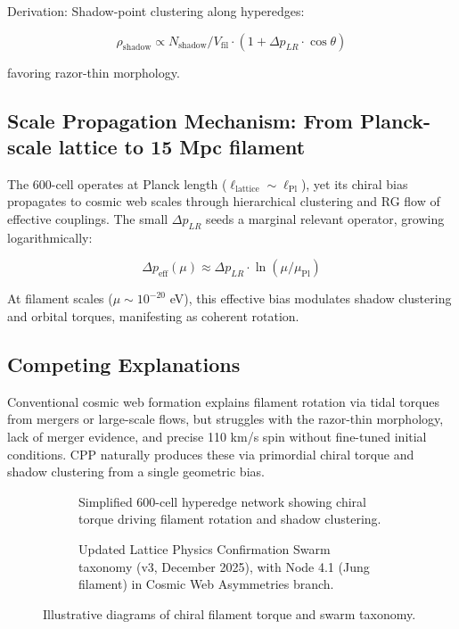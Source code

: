 \documentclass[11pt]{article}
\begin{document}
Derivation: Shadow-point clustering along hyperedges:

\[
\rho_{\text{shadow}} \propto N_{\text{shadow}} / V_{\text{fil}} \cdot (1 + \Delta p_{LR} \cdot \cos\theta)
\]

favoring razor-thin morphology.

\subsection{Scale Propagation Mechanism: From Planck-scale lattice to 15 Mpc filament}
The 600-cell operates at Planck length ($\ell_{\text{lattice}} \sim \ell_{\text{Pl}}$), yet its chiral bias propagates to cosmic web scales through hierarchical clustering and RG flow of effective couplings. The small $\Delta p_{LR}$ seeds a marginal relevant operator, growing logarithmically:

\[
\Delta p_{\text{eff}}(\mu) \approx \Delta p_{LR} \cdot \ln(\mu / \mu_{\text{Pl}})
\]

At filament scales ($\mu \sim 10^{-20}$ eV), this effective bias modulates shadow clustering and orbital torques, manifesting as coherent rotation.

\subsection{Competing Explanations}
Conventional cosmic web formation explains filament rotation via tidal torques from mergers or large-scale flows, but struggles with the razor-thin morphology, lack of merger evidence, and precise 110 km/s spin without fine-tuned initial conditions. CPP naturally produces these via primordial chiral torque and shadow clustering from a single geometric bias.

\begin{figure}[htbp]
\centering
\begin{subfigure}{0.45\textwidth}
\centering
\caption{Simplified 600-cell hyperedge network showing chiral torque driving filament rotation and shadow clustering.}
\label{fig:filament-torque}
\end{subfigure}
\hfill
\begin{subfigure}{0.45\textwidth}
\centering
\caption{Updated Lattice Physics Confirmation Swarm taxonomy (v3, December 2025), with Node 4.1 (Jung filament) in Cosmic Web Asymmetries branch.}
\label{fig:taxonomy-v3}
\end{subfigure}
\caption{Illustrative diagrams of chiral filament torque and swarm taxonomy.}
\end{figure}
\end{document}
